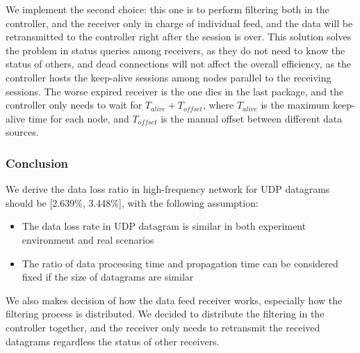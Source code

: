 \documentclass[11pt,openright,a4paper]{report}
\begin{document}
We implement the second choice: this one is to perform filtering both in the controller, and the receiver only in charge of individual feed, and the data will be retransmitted to the controller right after the session is over. This solution solves the problem in status queries among receivers, as they do not need to know the status of others, and dead connections will not affect the overall efficiency, as the controller hosts the keep-alive sessions among nodes parallel to the receiving sessions. The worse expired receiver is the one dies in the last package, and the controller only needs to wait for $T_{alive}+T_{offset}$, where $T_{alive}$ is the maximum keep-alive time for each node, and $T_{offset}$ is the manual offset between different data sources.\\
\subsubsection{Conclusion}
We derive the data loss ratio in high-frequency network for UDP datagrams should be  [2.639\%, 3.448\%], with the following assumption:
\begin{itemize}
	\item The data loss rate in UDP datagram is similar in both experiment environment and real scenarios
	\item The ratio of data processing time and propagation time can be considered fixed if the size of datagrams are similar
\end{itemize}
We also makes decision of how the data feed receiver works, especially how the filtering process is distributed. We decided to distribute the filtering in the controller together, and the receiver only needs to retransmit the received datagrams regardless the status of other receivers.
\newpage
\end{document}
